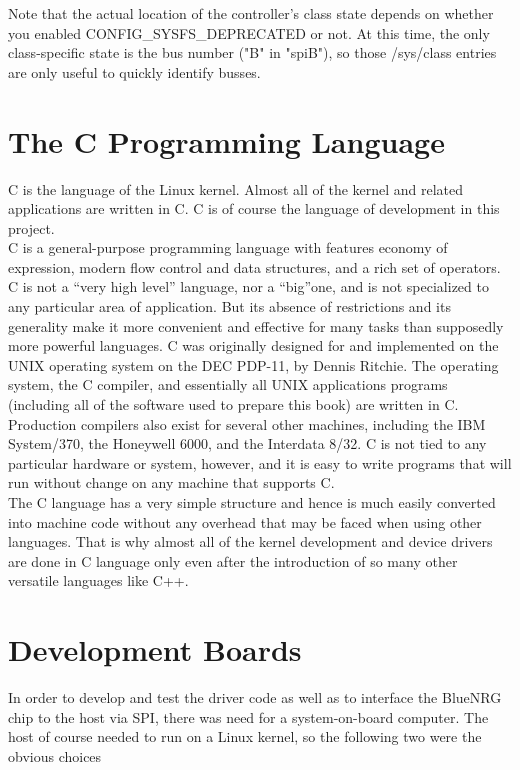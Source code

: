 Note that the actual location of the controller's class state depends on whether you enabled CONFIG\_SYSFS\_DEPRECATED or not.  At this time, the only class-specific state is the bus number ("B" in "spiB"), so those /sys/class entries are only useful to quickly identify busses.
\section{The C Programming Language}
C is the language of the Linux kernel. Almost all of the kernel and related applications are written in C. C is of course the language of development in this project.\\
C is a general-purpose programming language with features economy of expression, modern flow control and data structures, and a rich set of operators. C is not a ``very high level'' language, nor a ``big''one, and is not specialized to any particular area of application. But its absence of restrictions and its generality make it more convenient and effective for many tasks than supposedly more powerful languages. C was originally designed for and implemented on the UNIX operating system on the DEC PDP-11, by Dennis Ritchie. The operating system, the C compiler, and essentially all UNIX applications programs (including all of the software used to prepare this book) are written in C. Production compilers also exist for several other machines, including the IBM System/370, the Honeywell 6000, and the Interdata 8/32. C is not tied to any particular hardware or system, however, and it is easy to write programs that will run without change on any machine that supports C.\\
The C language has a very simple structure and hence is much easily converted into machine code without any overhead that may be faced when using other languages. That is why almost all of the kernel development and device drivers are done in C language only even after the introduction of so many other versatile languages like C++.
\section{Development Boards}
In order to develop and test the driver code as well as to interface the BlueNRG chip to the host via SPI, there was need for a system-on-board computer. The host of course needed to run on a Linux kernel, so the following two were the obvious choices
